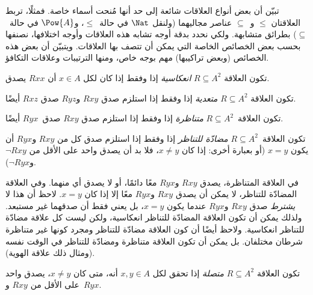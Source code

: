 \documentclass[../../../include/open-logic-section]{subfiles}
\begin{document}

\begin{intro}
تبيّن أن بعض أنواع العلاقات شائعة إلى حد أنها مُنحت أسماء خاصة. فمثلًا،
تربط العلاقتان $\le$ و~$\subseteq$ عناصر مجاليهما (ولنقل $\Nat$ في حالة~$\le$،
و$\Pow{A}$ في حالة~$\subseteq$) بطرائق متشابهة. ولكي نحدد بدقة أوجه تشابه
هذه العلاقات وأوجه اختلافها، نصنفها بحسب بعض الخصائص الخاصة التي يمكن أن
تتصف بها العلاقات. ويتبيّن أن بعض هذه الخصائص (وبعض تراكيبها) مهم بوجه
خاص، ومنها الترتيبات وعلاقات التكافؤ.
\end{intro}

\begin{defn}[الانعكاسية]
تكون العلاقة $R \subseteq A^2$ \emph{انعكاسية} إذا وفقط إذا كان لكل $x \in
A$ أن $Rxx$ يصدق.
\end{defn}

\begin{defn}[التعدية]
تكون العلاقة $R \subseteq A^2$ \emph{متعدية} إذا وفقط إذا استلزم صدق $Rxy$
و$Ryz$ صدق $Rxz$ أيضًا.
\end{defn}

\begin{defn}[التناظر]
تكون العلاقة~$R \subseteq A^2$ \emph{متناظرة} إذا وفقط إذا استلزم صدق
$Rxy$ صدق~$Ryx$ أيضًا.
\end{defn}

\begin{defn}
تكون العلاقة~$R \subseteq A^2$ \emph{مضادّة\- للتناظر\-} إذا وفقط إذا
استلزم صدق كل من $Rxy$ و$Ryx$ أن يكون $x=y$ (أو بعبارة أخرى: إذا كان $x\neq y$،
فلا بد أن يصدق واحد على الأقل من $\lnot Rxy$ و$\lnot Ryx$).
\end{defn}

\begin{explain}
في العلاقة المتناظرة، يصدق $Rxy$ و$Ryx$ معًا دائمًا، أو لا يصدق أي منهما.
وفي العلاقة المضادّة للتناظر، لا يمكن أن يصدق $Rxy$ و$Ryx$ معًا إلا إذا
كان $x = y$. لاحظ أن هذا لا \emph{يشترط} صدق $Rxy$ و$Ryx$ عندما يكون
$x = y$، بل يعني فقط أن صدقهما غير مستبعد. ولذلك يمكن أن تكون العلاقة
المضادّة للتناظر انعكاسية، ولكن ليست كل علاقة مضادّة للتناظر انعكاسية.
ولاحظ أيضًا أن كون العلاقة مضادّة للتناظر ومجرد كونها غير متناظرة شرطان
مختلفان. بل يمكن أن تكون العلاقة متناظرة ومضادّة للتناظر في الوقت نفسه
(ومثال ذلك علاقة الهوية).
\end{explain}

\begin{defn}[الاتصالية]
تكون العلاقة $R \subseteq A^2$ \emph{متصلة} إذا تحقق لكل $x,y\in
A$ أنه، متى كان $x \neq y$، يصدق واحد على الأقل من $Rxy$ و~$Ryx$.
\end{defn}
\end{document}
